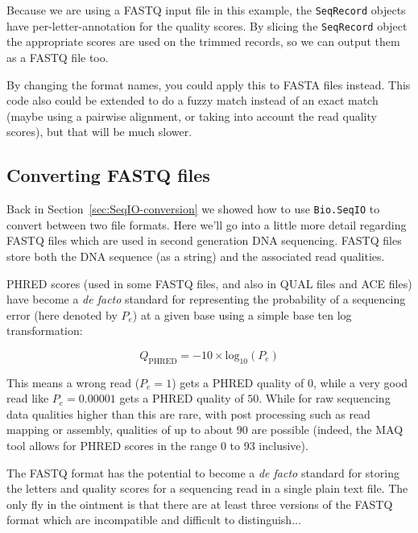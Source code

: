 \documentclass{report}
\begin{document}
Because we are using a FASTQ input file in this example, the \verb|SeqRecord|
objects have per-letter-annotation for the quality scores. By slicing the
\verb|SeqRecord| object the appropriate scores are used on the trimmed
records, so we can output them as a FASTQ file too.

By changing the format names, you could apply this to FASTA files instead.
This code also could be extended to do a fuzzy match instead of an exact
match (maybe using a pairwise alignment, or taking into account the read
quality scores), but that will be much slower.

\subsection{Converting FASTQ files}
\label{sec:SeqIO-fastq-conversion}

Back in Section~\ref{sec:SeqIO-conversion} we showed how to use
\verb|Bio.SeqIO| to convert between two file formats. Here we'll go into a
little more detail regarding FASTQ files which are used in second generation
DNA sequencing. FASTQ files store both the DNA sequence (as a string) and
the associated read qualities.

PHRED scores (used in some FASTQ files, and also in QUAL files and ACE
files) have become a \textit{de facto} standard for representing the
probability of a sequencing error (here denoted by $P_e$) at a given
base using a simple base ten log transformation:

\begin{equation}
Q_{\textrm{PHRED}} = - 10 \times \textrm{log}_{10} ( P_e )
\end{equation}

This means a wrong read ($P_e = 1$) gets a PHRED quality of $0$, while a very
good read like $P_e = 0.00001$ gets a PHRED quality of $50$. While for raw
sequencing data qualities higher than this are rare, with post processing
such as read mapping or assembly, qualities of up to about $90$ are possible
(indeed, the MAQ tool allows for PHRED scores in the range 0 to 93 inclusive).

The FASTQ format has the potential to become a \textit{de facto} standard for
storing the letters and quality scores for a sequencing read in a single plain
text file. The only fly in the ointment is that there are at least three
versions of the FASTQ format which are incompatible and difficult to
distinguish...
\end{document}
